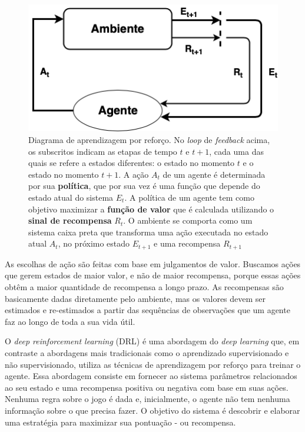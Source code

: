  \begin{figure}[h]
  \centering
  \includegraphics[width=.6 \textwidth]{conteudo/imgs/rl-diagram.png}
  \caption[Diagrama de aprendizagem por reforço]{Diagrama de aprendizagem por reforço. No \textit{loop} de \textit{feedback} acima, os subscritos indicam as etapas de tempo $t$ e $t + 1$, cada uma das quais se refere a estados diferentes: o estado no momento $t$ e o estado no momento $t + 1$. 
  A ação $A_t$ de um agente é determinada por sua \textbf{política}, que por sua vez é uma função que depende do estado atual do sistema $E_t$. A política de um agente tem como objetivo maximizar a \textbf{função de valor} que é calculada utilizando o \textbf{sinal de recompensa} $R_t$. O ambiente se comporta como um sistema caixa preta que transforma uma ação executada no estado atual $A_t$, no próximo estado $E_{t+1}$ e uma recompensa $R_{t+1}$
  }
  \label{rl-diagram}
 \end{figure}

 As escolhas de ação são feitas com base em julgamentos de valor.
 Buscamos ações que gerem estados de maior valor, e não de maior recompensa, porque essas ações obtêm a maior quantidade de recompensa a longo prazo. 
 As recompensas são basicamente dadas diretamente pelo ambiente, mas os valores devem ser estimados e re-estimados a partir das sequências de observações que um agente faz ao longo de toda a sua vida útil.


 O \textit{deep reinforcement learning} (DRL) é uma abordagem do \textit{deep learning} que, em contraste a abordagens mais tradicionais como o aprendizado supervisionado e não supervisionado, utiliza as técnicas de aprendizagem por reforço para treinar o agente. Essa abordagem consiste em fornecer ao sistema parâmetros relacionados ao seu estado e uma recompensa positiva ou negativa com base em suas ações. Nenhuma regra sobre o jogo é dada e, inicialmente, o agente não tem nenhuma informação sobre o que precisa fazer. O objetivo do sistema é descobrir e elaborar uma estratégia para maximizar sua pontuação - ou recompensa.



